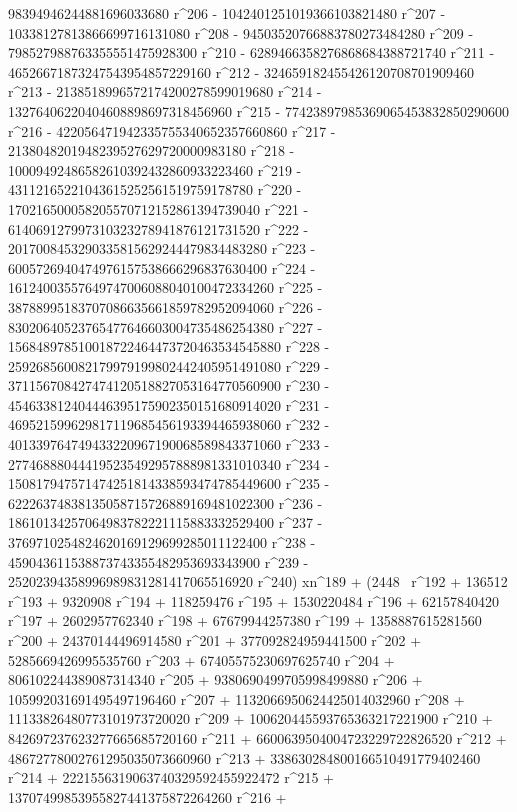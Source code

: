        98394946244881696033680 r^206 - 
       1042401251019366103821480 r^207 - 
       10338127813866699716131080 r^208 - 
       94503520766883780273484280 r^209 - 
       798527988763355551475928300 r^210 - 
       6289466358276868684388721740 r^211 - 
       46526671873247543954857229160 r^212 - 
       324659182455426120708701909460 r^213 - 
       2138518996572174200278599019680 r^214 - 
       13276406220404608898697318456960 r^215 - 
       77423897985369065453832850290600 r^216 - 
       422056471942335755340652357660860 r^217 - 
       2138048201948239527629720000983180 r^218 - 
       10009492486582610392432860933223460 r^219 - 
       43112165221043615252561519759178780 r^220 - 
       170216500058205570712152861394739040 r^221 - 
       614069127997310323278941876121731520 r^222 - 
       2017008453290335815629244479834483280 r^223 - 
       6005726940474976157538666296837630400 r^224 - 
       16124003557649747006088040100472334260 r^225 - 
       38788995183707086635661859782952094060 r^226 - 
       83020640523765477646603004735486254380 r^227 - 
       156848978510018722464473720463534545880 r^228 - 
       259268560082179979199802442405951491080 r^229 - 
       371156708427474120518827053164770560900 r^230 - 
       454633812404446395175902350151680914020 r^231 - 
       469521599629817119685456193394465938060 r^232 - 
       401339764749433220967190068589843371060 r^233 - 
       277468880444195235492957888981331010340 r^234 - 
       150817947571474251814338593474785449600 r^235 - 
       62226374838135058715726889169481022300 r^236 - 
       18610134257064983782221115883332529400 r^237 - 
       3769710254824620169129699285011122400 r^238 - 
       459043611538873743355482953693343900 r^239 - 
       25202394358996989831281417065516920 r^240) xn^189 + (2448 \
r^192 + 136512 r^193 + 9320908 r^194 + 118259476 r^195 + 
       1530220484 r^196 + 62157840420 r^197 + 2602957762340 r^198 + 
       67679944257380 r^199 + 1358887615281560 r^200 + 
       24370144496914580 r^201 + 377092824959441500 r^202 + 
       5285669426995535760 r^203 + 67405575230697625740 r^204 + 
       806102244389087314340 r^205 + 9380690499705998499880 r^206 + 
       105992031691495497196460 r^207 + 
       1132066950624425014032960 r^208 + 
       11133826480773101973720020 r^209 + 
       100620445593765363217221900 r^210 + 
       842697237623277665685720160 r^211 + 
       6600639504004723229722826520 r^212 + 
       48672778002761295035073660960 r^213 + 
       338630284800166510491779402460 r^214 + 
       2221556319063740329592455922472 r^215 + 
       13707499853955827441375872264260 r^216 + 
